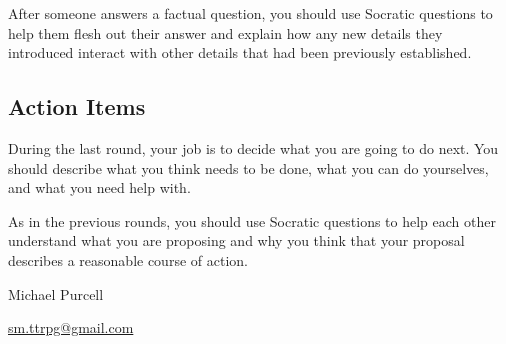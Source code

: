\documentclass[a6paper, 11pt, parskip=half]{scrartcl}
\begin{document}
After someone answers a factual question, you should use Socratic questions to help them flesh out their answer and explain how any new details they introduced interact with other details that had been previously established.

\newpage
\enlargethispage{3.5\baselineskip}

\subsection*{Action Items}
During the last round, your job is to decide what you are going to do next.
You should describe what you think needs to be done, what you can do yourselves, and what you need help with.

As in the previous rounds, you should use Socratic questions to help each other understand what you are proposing and why you think that your proposal describes a reasonable course of action.

\vfill
\hrulefill
\begin{description}[nosep]
\item[\textbf{Design}:] Michael Purcell \\
\item[\textbf{Contact}:] \href{mailto:sm.ttrpg@gmail.com}{sm.ttrpg@gmail.com}\\
\item[\textbf{License}:] \doclicenseText%
\end{description}
\end{document}
